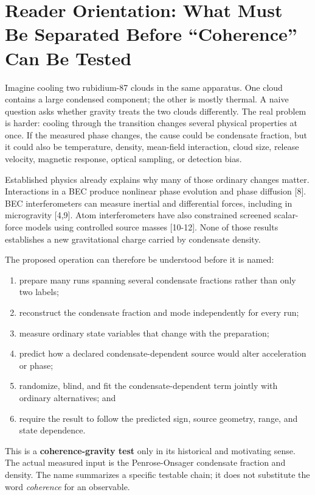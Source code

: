 \documentclass[
  american,
  11pt,
  letterpaper,
]{article}
\providecommand{\tightlist}{%
  \setlength{\itemsep}{0pt}\setlength{\parskip}{0pt}}
\begin{document}
\section{Reader Orientation: What Must Be Separated Before ``Coherence'' Can Be Tested}\label{reader-orientation-what-must-be-separated-before-coherence-can-be-tested}

Imagine cooling two rubidium-87 clouds in the same apparatus. One cloud contains a large condensed component; the other is mostly thermal. A naive question asks whether gravity treats the two clouds differently. The real problem is harder: cooling through the transition changes several physical properties at once. If the measured phase changes, the cause could be condensate fraction, but it could also be temperature, density, mean-field interaction, cloud size, release velocity, magnetic response, optical sampling, or detection bias.

Established physics already explains why many of those ordinary changes matter. Interactions in a BEC produce nonlinear phase evolution and phase diffusion {[}8{]}. BEC interferometers can measure inertial and differential forces, including in microgravity {[}4,9{]}. Atom interferometers have also constrained screened scalar-force models using controlled source masses {[}10-12{]}. None of those results establishes a new gravitational charge carried by condensate density.

The proposed operation can therefore be understood before it is named:

\begin{enumerate}
\def\labelenumi{\arabic{enumi}.}
\tightlist
\item
  prepare many runs spanning several condensate fractions rather than only two labels;
\item
  reconstruct the condensate fraction and mode independently for every run;
\item
  measure ordinary state variables that change with the preparation;
\item
  predict how a declared condensate-dependent source would alter acceleration or phase;
\item
  randomize, blind, and fit the condensate-dependent term jointly with ordinary alternatives; and
\item
  require the result to follow the predicted sign, source geometry, range, and state dependence.
\end{enumerate}

This is a \textbf{coherence-gravity test} only in its historical and motivating sense. The actual measured input is the Penrose-Onsager condensate fraction and density. The name summarizes a specific testable chain; it does not substitute the word \emph{coherence} for an observable.
\end{document}

